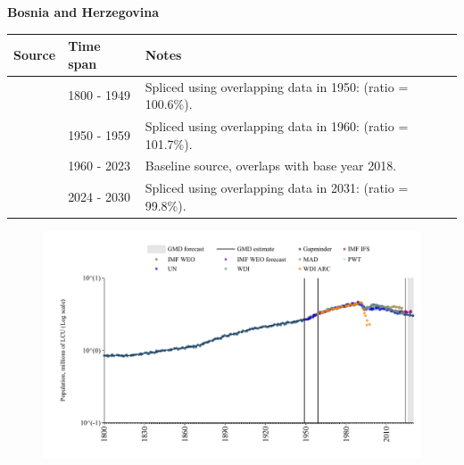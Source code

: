 \documentclass[12pt,a4paper,landscape]{article}
\begin{document}
\begin{adjustbox}{max totalsize={\paperwidth}{\paperheight},center}
\begin{minipage}[t][\textheight][t]{\textwidth}
\vspace*{0.5cm}
{}
\begin{center}
{\Large\bfseries Bosnia and Herzegovina}
\end{center}
\vspace{0.5cm}
\begin{table}[H]
\centering
\small
\begin{tabular}{|l|l|l|}
\hline
\textbf{Source} & \textbf{Time span} & \textbf{Notes} \\
\hline
\rowcolor{white}\cite{Gapminder}& 1800 - 1949 &Spliced using overlapping data in 1950: (ratio = 100.6\%).\\
\rowcolor{lightgray}\cite{IMF_IFS}& 1950 - 1959 &Spliced using overlapping data in 1960: (ratio = 101.7\%).\\
\rowcolor{white}\cite{WDI}& 1960 - 2023 &Baseline source, overlaps with base year 2018.\\
\rowcolor{lightgray}\cite{Gapminder}& 2024 - 2030 &Spliced using overlapping data in 2031: (ratio = 99.8\%).\\
\hline
\end{tabular}
\end{table}
\begin{figure}[H]
\centering
\includegraphics[width=\textwidth,height=0.6\textheight,keepaspectratio]{graphs/BIH_pop.pdf}
\end{figure}
\end{minipage}
\end{adjustbox}
\end{document}
